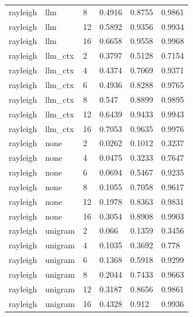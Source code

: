 \begin{tabular}{llllll}
rayleigh & llm & 8 & 0.4916 & 0.8755 & 0.9861 \\
rayleigh & llm & 12 & 0.5892 & 0.9356 & 0.9934 \\
rayleigh & llm & 16 & 0.6658 & 0.9558 & 0.9968 \\
rayleigh & llm\_ctx & 2 & 0.3797 & 0.5128 & 0.7154 \\
rayleigh & llm\_ctx & 4 & 0.4374 & 0.7069 & 0.9371 \\
rayleigh & llm\_ctx & 6 & 0.4936 & 0.8288 & 0.9765 \\
rayleigh & llm\_ctx & 8 & 0.547 & 0.8899 & 0.9895 \\
rayleigh & llm\_ctx & 12 & 0.6439 & 0.9433 & 0.9943 \\
rayleigh & llm\_ctx & 16 & 0.7053 & 0.9635 & 0.9976 \\
rayleigh & none & 2 & 0.0262 & 0.1012 & 0.3237 \\
rayleigh & none & 4 & 0.0475 & 0.3233 & 0.7647 \\
rayleigh & none & 6 & 0.0694 & 0.5467 & 0.9235 \\
rayleigh & none & 8 & 0.1055 & 0.7058 & 0.9617 \\
rayleigh & none & 12 & 0.1978 & 0.8363 & 0.9831 \\
rayleigh & none & 16 & 0.3054 & 0.8908 & 0.9903 \\
rayleigh & unigram & 2 & 0.066 & 0.1359 & 0.3456 \\
rayleigh & unigram & 4 & 0.1035 & 0.3692 & 0.778 \\
rayleigh & unigram & 6 & 0.1368 & 0.5918 & 0.9299 \\
rayleigh & unigram & 8 & 0.2044 & 0.7433 & 0.9663 \\
rayleigh & unigram & 12 & 0.3187 & 0.8656 & 0.9861 \\
rayleigh & unigram & 16 & 0.4328 & 0.912 & 0.9936 \\
\hline
\end{tabular}

